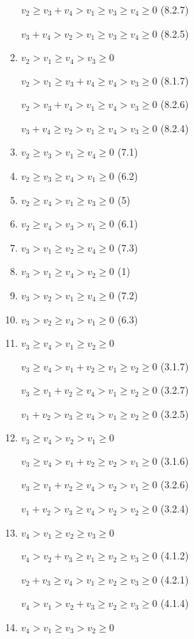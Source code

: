 \documentclass{article}
\begin{document}
\begin{enumerate}
    $v_2\geq{v_3+v_4}>v_1\geq{v_3}\geq{v_4}\geq{0}$ (8.2.7)

    $v_3+v_4>{v_2}>v_1\geq{v_3}\geq{v_4}\geq{0}$ (8.2.5)

    \item $v_2>v_1\geq{v_4}>v_3\geq{0}$

    $v_2>v_1\geq{v_3+v_4}\geq{v_4}>v_3\geq{0}$ (8.1.7)

    $v_2>v_3+v_4>v_1\geq{v_4}>v_3\geq{0}$ (8.2.6)

    $v_3+v_4\geq{v_2}>v_1\geq{v_4}>v_3\geq{0}$ (8.2.4)

    \item $v_2\geq{v_3}>v_1\geq{v_4}\geq{0}$ (7.1)
    \item $v_2\geq{v_3}\geq{v_4}>v_1\geq{0}$ (6.2)
    \item $v_2\geq{v_4}>v_1\geq{v_3}\geq{0}$ (5)
    \item $v_2\geq{v_4}>v_3>v_1\geq{0}$ (6.1)
    \item $v_3>v_1\geq{v_2}\geq{v_4}\geq{0}$ (7.3)
    \item $v_3>v_1\geq{v_4}>v_2\geq{0}$ (1)
    \item $v_3>v_2>v_1\geq{v_4}\geq{0}$ (7.2)
    \item $v_3>v_2\geq{v_4}>v_1\geq{0}$ (6.3)
    \item $v_3\geq{v_4}>v_1\geq{v_2}\geq{0}$

    $v_3\geq{v_4}>v_1+v_2\geq{v_1}\geq{v_2}\geq{0}$ (3.1.7)

    $v_3\geq{v_1+v_2}\geq{v_4}>v_1\geq{v_2}\geq{0}$ (3.2.7)

    $v_1+v_2>v_3\geq{v_4}>v_1\geq{v_2}\geq{0}$ (3.2.5)

    \item $v_3\geq{v_4}>v_2>v_1\geq{0}$

    $v_3\geq{v_4}>v_1+v_2\geq{v_2}>v_1\geq{0}$ (3.1.6)

    $v_3\geq{v_1+v_2}\geq{v_4>}v_2>v_1\geq{0}$ (3.2.6)

    $v_1+v_2>v_3\geq{v_4}>v_2>v_2\geq{0}$ (3.2.4)

    \item $v_4>v_1\geq{v_2}\geq{v_3}\geq{0}$

    $v_4>{v_2+v_3}\geq{v_1}\geq{v_2}\geq{v_3}\geq{0}$ (4.1.2)

    $v_2+v_3\geq{v_4}>v_1\geq{v_2}\geq{v_3}\geq{0}$ (4.2.1)
    
    $v_4>v_1>v_2+v_3\geq{v_2}\geq{v_3}\geq{0}$ (4.1.4)

    \item $v_4>v_1\geq{v_3}>v_2\geq{0}$


\end{enumerate}
\end{document}
